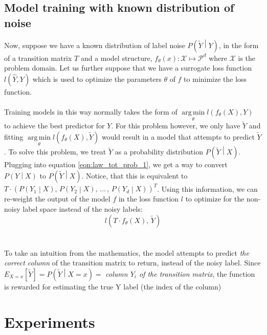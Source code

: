 \documentclass{article} %
\newcommand{\PR}[1]{{P\left(#1\right)}}
\newcommand{\B}[1]{{\left(#1\right)}}
\newcommand{\SB}[1]{{\left[#1\right]}}
\DeclareMathOperator*{\argmin}{arg\,min}
\newcommand{\Yh}{\widehat{Y}}
\newcommand{\Yn}{\widetilde{Y}}
\begin{document}
\subsection{Model training with known distribution of noise}
Now, suppose we have a known distribution of label noise $\PR{\Yn\middle|Y}$, in the form of a transition matrix $T$ and a model structure, $f_\theta\B{x} : \mathcal X \mapsto \mathcal P^d$ where $\mathcal X$ is the problem domain.
Let us further suppose that we have a surrogate loss function $l\B{\Yh, Y}$ which is used to optimize the parameters $\theta$ of $f$ to minimize the loss function.
\\\\
Training models in this way normally takes the form of $\argmin\limits_\theta l\B{f_\theta\B{X}, Y}$ to achieve the best predictor for $Y$.
For this problem however, we only have $\Yn$ and fitting $\argmin\limits_\theta l\B{f_\theta\B{X}, \Yn}$ would result in a model that attempts to predict $\Yn$.
To solve this problem, we treat $\Yn$ as a probability distribution $\PR{\Yn \middle| X}$.
Plugging into equation \ref{eqn:law_tot_prob_1}, we get a way to convert $\PR{Y \middle| X}$ to $\PR{\Yn \middle| X}$.
Notice, that this is equivalent to $
T \cdot \B{\PR{Y_1 \middle| X},\,\PR{Y_2 \middle|X},\,\dots\,,\,\PR{Y_d\middle|X}}^T
$.
Using this information, we can re-weight the output of the model $f$ in the loss function $l$ to optimize for the non-noisy label space instead of the noisy labels:
\begin{equation}
    l\B{T \cdot f_\theta\B{X},\, \Yn}
    \label{eqn:noise_correction}
\end{equation}
\\\\
To take an intuition from the mathematics, the model attempts to predict \emph{the correct column} of the transition matrix to return, instead of the noisy label.
Since $E_{X = x}\SB{\Yn} = \PR{\Yn \middle| X=x} =$ \emph{column $Y_i$ of the transition matrix}, the function is rewarded for estimating the true Y label (the index of the column)






\clearpage
\section{Experiments}
\end{document}
